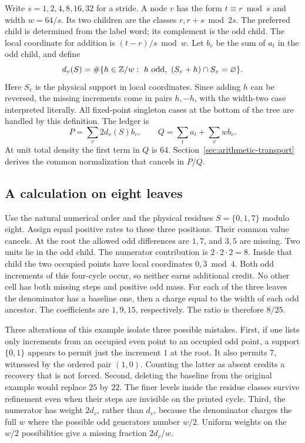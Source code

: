 \documentclass[12pt,letterpaper]{article}
\begin{document}
Write \(s=1,2,4,8,16,32\) for a stride. A node \(v\) has the form \(t\equiv r\bmod s\) and width \(w=64/s\). Its two children are the classes \(r,r+s\bmod 2s\). The preferred child is determined from the label word; its complement is the odd child. The local coordinate for addition is \((t-r)/s\bmod w\). Let \(b_v\) be the sum of \(a_t\) in the odd child, and define
\[
 d_v(S)=\#\{h\in\mathbb Z/w:\ h\ {\rm odd},\
                 (S_v+h)\cap S_v=\varnothing\}.
\]
Here \(S_v\) is the physical support in local coordinates. Since adding \(h\) can be reversed, the missing increments come in pairs \(h,-h\), with the width-two case interpreted literally. All fixed-point singleton cases at the bottom of the tree are handled by this definition. The ledger is
\[
 P=\sum_v 2d_v(S)b_v,\qquad Q=\sum_t a_t+\sum_v w b_v.
 \tag{L}\label{eq:ledger-basic}
\]
At unit total density the first term in \(Q\) is 64. Section~\ref{sec:arithmetic-transport} derives the common normalization that cancels in \(P/Q\).

\subsection{A calculation on eight leaves}
Use the natural numerical order and the physical residues \(S=\{0,1,7\}\) modulo eight. Assign equal positive rates to these three positions. Their common value cancels. At the root the allowed odd differences are \(1,7\), and \(3,5\) are missing. Two units lie in the odd child. The numerator contribution is \(2\cdot2\cdot2=8\). Inside that child the two occupied points have local coordinates \(0,3\bmod4\). Both odd increments of this four-cycle occur, so neither earns additional credit. No other cell has both missing steps and positive odd mass. For each of the three leaves the denominator has a baseline one, then a charge equal to the width of each odd ancestor. The coefficients are \(1,9,15\), respectively. The ratio is therefore \(8/25\).

Three alterations of this example isolate three possible mistakes. First, if one lists only increments from an occupied even point to an occupied odd point, a support \(\{0,1\}\) appears to permit just the increment \(1\) at the root. It also permits \(7\), witnessed by the ordered pair \((1,0)\). Counting the latter as absent credits a recovery that is not forced. Second, deleting the baseline from the original example would replace \(25\) by \(22\). The finer levels inside the residue classes survive refinement even when their steps are invisible on the printed cycle. Third, the numerator has weight \(2d_v\), rather than \(d_v\), because the denominator charges the full \(w\) where the possible odd generators number \(w/2\). Uniform weights on the \(w/2\) possibilities give a missing fraction \(2d_v/w\).
\end{document}
